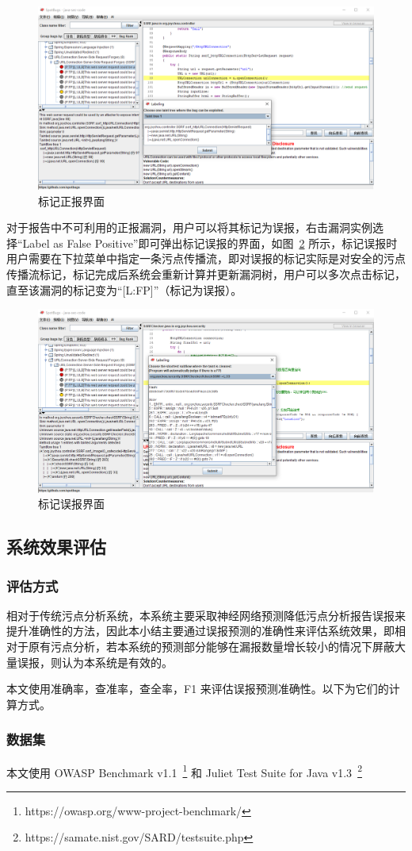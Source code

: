 \begin{figure}[!htbp]
    \centering
    \includegraphics[width=0.8\linewidth]{FIGs/chapter4/labelTP.png}
    \caption{标记正报界面}\label{show:labelTP}
\end{figure}

对于报告中不可利用的正报漏洞，用户可以将其标记为误报，右击漏洞实例选择“Label as False Positive”即可弹出标记误报的界面，如图~\ref{show:labelFP} 所示，标记误报时用户需要在下拉菜单中指定一条污点传播流，即对误报的标记实际是对安全的污点传播流标记，标记完成后系统会重新计算并更新漏洞树，用户可以多次点击标记，直至该漏洞的标记变为“[L:FP]”（标记为误报）。

\begin{figure}[!htbp]
    \centering
    \includegraphics[width=0.8\linewidth]{FIGs/chapter4/labelFP.png}
    \caption{标记误报界面}\label{show:labelFP}
\end{figure}

\subsection{系统效果评估}

\subsubsection{评估方式}
相对于传统污点分析系统，本系统主要采取神经网络预测降低污点分析报告误报来提升准确性的方法，因此本小结主要通过误报预测的准确性来评估系统效果，即相对于原有污点分析，若本系统的预测部分能够在漏报数量增长较小的情况下屏蔽大量误报，则认为本系统是有效的。

本文使用准确率，查准率，查全率，F1 来评估误报预测准确性。以下为它们的计算方式。

\subsubsection{数据集}
本文使用 OWASP Benchmark v1.1~\footnote{https://owasp.org/www-project-benchmark/} 和 Juliet Test Suite for Java v1.3~\footnote{https://samate.nist.gov/SARD/testsuite.php}
